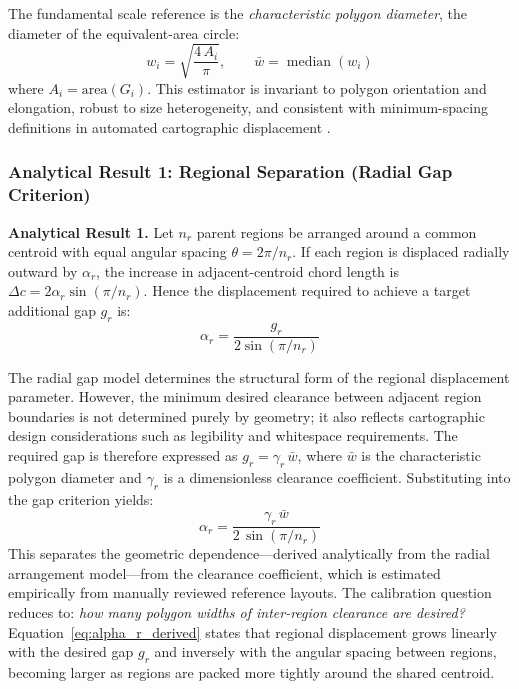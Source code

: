 \documentclass[12pt, a4paper]{article}
\numberwithin{equation}{section}
\begin{document}
The fundamental scale reference is the \emph{characteristic polygon diameter}, the diameter of the equivalent-area circle:
\begin{equation}
  w_i = \sqrt{\frac{4\,A_i}{\pi}}, \qquad \bar{w} = \operatorname{median}(w_i)
  \label{eq:wbar}
\end{equation}
where $A_i = \text{area}(G_i)$. This estimator is invariant to polygon orientation and elongation, robust to size heterogeneity, and consistent with minimum-spacing definitions in automated cartographic displacement \citep{steiniger2007}.

\subsubsection{Analytical Result 1: Regional Separation (Radial Gap Criterion)}

\begin{mdframed}[linecolor=blue!50!black, linewidth=1pt, topline=true, bottomline=true, rightline=false, leftline=false]
\textbf{Analytical Result 1.} Let $n_r$ parent regions be arranged around a common centroid with equal angular spacing $\theta = 2\pi/n_r$. If each region is displaced radially outward by $\alpha_r$, the increase in adjacent-centroid chord length is $\Delta c = 2\alpha_r\sin(\pi/n_r)$.
Hence the displacement required to achieve a target additional gap $g_r$ is:
\[
  \alpha_r = \frac{g_r}{2\sin(\pi/n_r)}
\]
\end{mdframed}

\noindent The radial gap model determines the structural form of the regional displacement parameter. However, the minimum desired clearance between adjacent region boundaries is not determined purely by geometry; it also reflects cartographic design considerations such as legibility and whitespace requirements. The required gap is therefore expressed as $g_r = \gamma_r\,\bar{w}$, where $\bar{w}$ is the characteristic polygon diameter and $\gamma_r$ is a dimensionless clearance coefficient. Substituting into the gap criterion yields:
\begin{equation}
  \boxed{\alpha_r = \frac{\gamma_r\,\bar{w}}{2\,\sin(\pi / n_r)}}
  \label{eq:alpha_r_derived}
\end{equation}
This separates the geometric dependence---derived analytically from the radial arrangement model---from the clearance coefficient, which is estimated empirically from manually reviewed reference layouts. The calibration question reduces to: \emph{how many polygon widths of inter-region clearance are desired?} Equation~\eqref{eq:alpha_r_derived} states that regional displacement grows linearly with the desired gap $g_r$ and inversely with the angular spacing between regions, becoming larger as regions are packed more tightly around the shared centroid.
\end{document}
